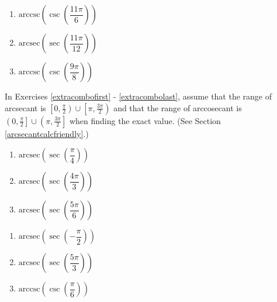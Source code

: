 \documentclass{ximera}
\begin{document}
\begin{multicols}{3}

\begin{enumerate}

\setcounter{enumi}{\value{HW}}

\item  $\text{arccsc}\left(\csc\left(\dfrac{11\pi}{6}\right) \right)$ 
\item  $\text{arcsec}\left(\sec\left(\dfrac{11\pi}{12}\right) \right)$
\item  $\text{arccsc}\left(\csc\left(\dfrac{9\pi}{8}\right) \right)$ \label{moreextracombolast}

\setcounter{HW}{\value{enumi}}

\end{enumerate}

\end{multicols}


In Exercises \ref{extracombofirst} - \ref{extracombolast}, assume that the range of arcsecant is $\left[0, \frac{\pi}{2} \right) \cup \left[\pi, \frac{3\pi}{2} \right)$ and that the range of arccosecant is $\left(0, \frac{\pi}{2} \right] \cup \left( \pi, \frac{3\pi}{2} \right]$ when finding the exact value. (See Section \ref{arcsecantcalcfriendly}.)


\begin{multicols}{3}

\begin{enumerate}

\setcounter{enumi}{\value{HW}}

\item  $\text{arcsec}\left(\sec\left(\dfrac{\pi}{4}\right) \right)$  \label{extracombofirst}
\item  $\text{arcsec}\left(\sec\left(\dfrac{4\pi}{3}\right) \right)$
\item  $\text{arcsec}\left(\sec\left( \dfrac{5\pi}{6} \right) \right)$

\setcounter{HW}{\value{enumi}}

\end{enumerate}

\end{multicols}

\begin{multicols}{3}

\begin{enumerate}

\setcounter{enumi}{\value{HW}}

\item  $\text{arcsec}\left(\sec\left(-\dfrac{\pi}{2} \right) \right)$ 
\item  $\text{arcsec}\left(\sec\left(\dfrac{5\pi}{3}\right) \right)$
\item  $\text{arccsc}\left(\csc\left(\dfrac{\pi}{6}\right) \right)$ 

\setcounter{HW}{\value{enumi}}

\end{enumerate}

\end{multicols}
\end{document}
